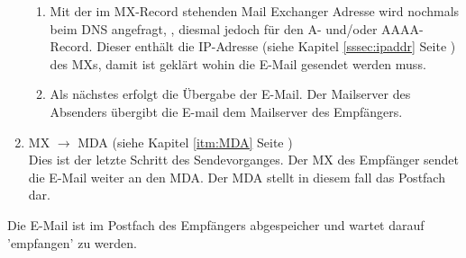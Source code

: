 \documentclass[12pt,a4paper]{report}
\begin{document}
\begin{onehalfspace}
\begin{enumerate}
\begin{enumerate}
\item Mit der im MX-Record stehenden Mail Exchanger Adresse wird nochmals beim DNS angefragt, , diesmal jedoch für den A- und/oder AAAA-Record.  Dieser enthält die IP-Adresse (siehe Kapitel \ref{sssec:ipaddr} Seite \pageref{sssec:ipaddr}) des MXs, damit ist geklärt wohin die E-Mail gesendet werden muss.
\item Als nächstes erfolgt die Übergabe der E-Mail. Der Mailserver des Absenders übergibt die E-mail dem Mailserver des Empfängers. 
\end{enumerate}
\item MX $\rightarrow$ MDA (siehe Kapitel \ref{itm:MDA} Seite \pageref{itm:MDA})\\
Dies ist der letzte Schritt des Sendevorganges. Der MX des Empfänger sendet die E-Mail weiter an den MDA. Der MDA stellt in diesem fall das Postfach dar.
\end{enumerate}
Die E-Mail ist im Postfach des Empfängers abgespeicher und wartet darauf 'empfangen' zu werden. 

\end{onehalfspace}
\end{document}
